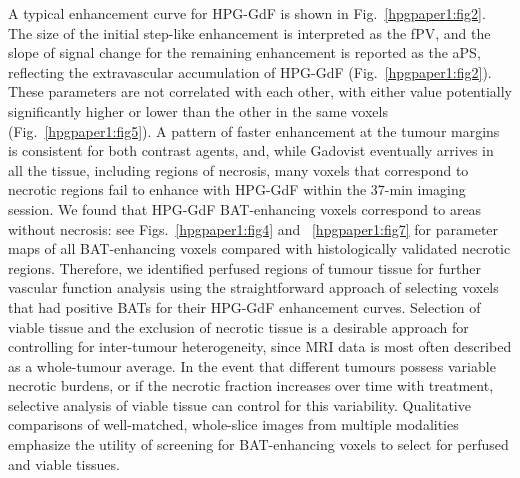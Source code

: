 A typical enhancement curve for \acs{HPG-GdF} is shown in Fig.~\ref{hpgpaper1:fig2}.
The size of the initial step-like enhancement is interpreted as the \acs{fPV}, and the slope of signal change for the remaining enhancement is reported as the \acs{aPS}, reflecting the extravascular accumulation of \acs{HPG-GdF} (Fig.~\ref{hpgpaper1:fig2}).
These parameters are not correlated with each other, with either value potentially significantly higher or lower than the other in the same voxels (Fig.~\ref{hpgpaper1:fig5}).
A pattern of faster enhancement at the tumour margins is consistent for both contrast agents, and, while Gadovist eventually arrives in all the tissue, including regions of necrosis, many voxels that correspond to necrotic regions fail to enhance with \acs{HPG-GdF} within the 37-min imaging session.
We found that \acs{HPG-GdF} \acs{BAT}-enhancing voxels correspond to areas without necrosis: see Figs.~\ref{hpgpaper1:fig4} and ~\ref{hpgpaper1:fig7} for parameter maps of all \acs{BAT}-enhancing voxels compared with histologically validated necrotic regions.
Therefore, we identified perfused regions of tumour tissue for further vascular function analysis using the straightforward approach of selecting voxels that had positive \acs{BAT}s for their \acs{HPG-GdF} enhancement curves.
Selection of viable tissue and the exclusion of necrotic tissue is a desirable approach for controlling for inter-tumour heterogeneity, since MRI data is most often described as a whole-tumour average.
In the event that different tumours possess variable necrotic burdens, or if the necrotic fraction increases over time with treatment, selective analysis of viable tissue can control for this variability.
Qualitative comparisons of well-matched, whole-slice images from multiple modalities emphasize the utility of screening for \acs{BAT}-enhancing voxels to select for perfused and viable tissues.

